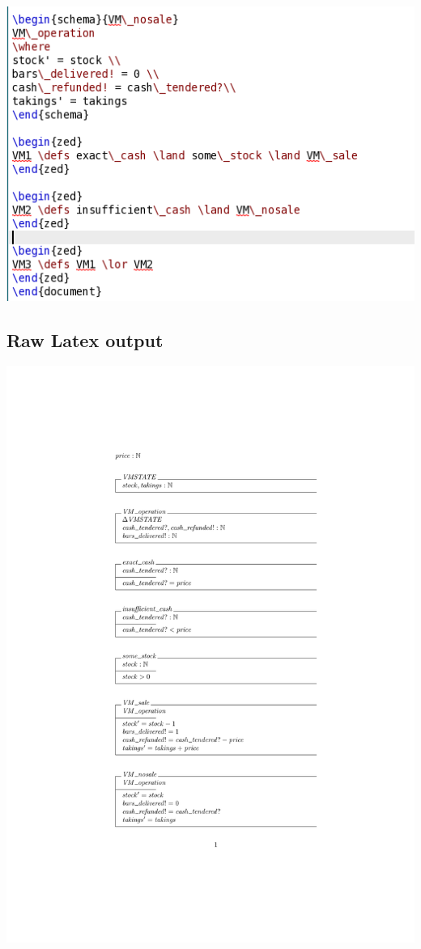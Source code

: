 \noindent \includegraphics[scale=0.5]{examples/vm/0imageb.png}
\subsection{Raw Latex output}
\label{app:vm0o}

\includegraphics[clip, trim=5cm 5.5cm 5cm 5cm]{examples/vm/0comp.pdf}

